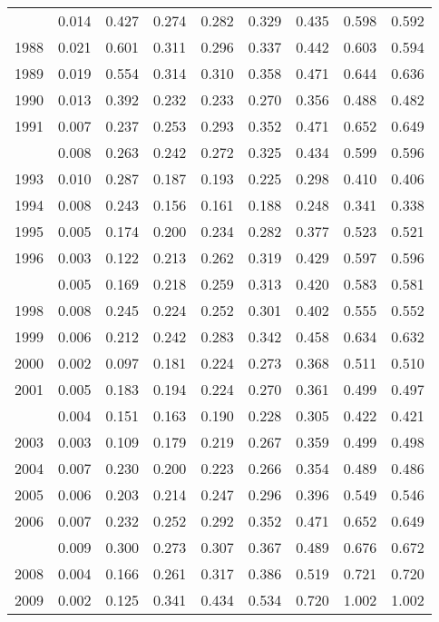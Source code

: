 \documentclass[
]{article}
\begin{document}
\begin{longtable}[t]{lrrrrrrrr}
\endfoot
\bottomrule
\endlastfoot
1987 & 0.014 & 0.427 & 0.274 & 0.282 & 0.329 & 0.435 & 0.598 & 0.592\\
1988 & 0.021 & 0.601 & 0.311 & 0.296 & 0.337 & 0.442 & 0.603 & 0.594\\
1989 & 0.019 & 0.554 & 0.314 & 0.310 & 0.358 & 0.471 & 0.644 & 0.636\\
1990 & 0.013 & 0.392 & 0.232 & 0.233 & 0.270 & 0.356 & 0.488 & 0.482\\
1991 & 0.007 & 0.237 & 0.253 & 0.293 & 0.352 & 0.471 & 0.652 & 0.649\\
\addlinespace
1992 & 0.008 & 0.263 & 0.242 & 0.272 & 0.325 & 0.434 & 0.599 & 0.596\\
1993 & 0.010 & 0.287 & 0.187 & 0.193 & 0.225 & 0.298 & 0.410 & 0.406\\
1994 & 0.008 & 0.243 & 0.156 & 0.161 & 0.188 & 0.248 & 0.341 & 0.338\\
1995 & 0.005 & 0.174 & 0.200 & 0.234 & 0.282 & 0.377 & 0.523 & 0.521\\
1996 & 0.003 & 0.122 & 0.213 & 0.262 & 0.319 & 0.429 & 0.597 & 0.596\\
\addlinespace
1997 & 0.005 & 0.169 & 0.218 & 0.259 & 0.313 & 0.420 & 0.583 & 0.581\\
1998 & 0.008 & 0.245 & 0.224 & 0.252 & 0.301 & 0.402 & 0.555 & 0.552\\
1999 & 0.006 & 0.212 & 0.242 & 0.283 & 0.342 & 0.458 & 0.634 & 0.632\\
2000 & 0.002 & 0.097 & 0.181 & 0.224 & 0.273 & 0.368 & 0.511 & 0.510\\
2001 & 0.005 & 0.183 & 0.194 & 0.224 & 0.270 & 0.361 & 0.499 & 0.497\\
\addlinespace
2002 & 0.004 & 0.151 & 0.163 & 0.190 & 0.228 & 0.305 & 0.422 & 0.421\\
2003 & 0.003 & 0.109 & 0.179 & 0.219 & 0.267 & 0.359 & 0.499 & 0.498\\
2004 & 0.007 & 0.230 & 0.200 & 0.223 & 0.266 & 0.354 & 0.489 & 0.486\\
2005 & 0.006 & 0.203 & 0.214 & 0.247 & 0.296 & 0.396 & 0.549 & 0.546\\
2006 & 0.007 & 0.232 & 0.252 & 0.292 & 0.352 & 0.471 & 0.652 & 0.649\\
\addlinespace
2007 & 0.009 & 0.300 & 0.273 & 0.307 & 0.367 & 0.489 & 0.676 & 0.672\\
2008 & 0.004 & 0.166 & 0.261 & 0.317 & 0.386 & 0.519 & 0.721 & 0.720\\
2009 & 0.002 & 0.125 & 0.341 & 0.434 & 0.534 & 0.720 & 1.002 & 1.002\\

\end{longtable}
\end{document}
